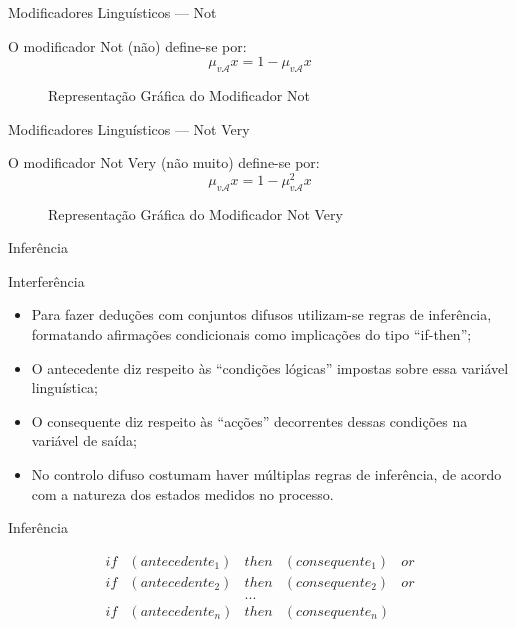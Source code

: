 \documentclass[portuges]{beamer}
\begin{document}
\begin{frame}{Modificadores Linguísticos --- Not}
	\begin{definition}[Not]
		O modificador \alert{Not} (não) define-se por:
		$$\mu_{v\mathcal{A}}{x} = 1 - \mu_{v\mathcal{A}}{x}$$ 
	\end{definition}
	\begin{figure}
			\centering
			\caption{Representação Gráfica do Modificador Not}
	\end{figure}	
\end{frame}

\begin{frame}{Modificadores Linguísticos --- Not Very}
	\begin{definition}
		O modificador \alert{Not Very} (não muito) define-se por:
		$$\mu_{v\mathcal{A}}{x} = 1 - \mu_{v\mathcal{A}}^2{x}$$ 
	\end{definition}
	\begin{figure}
			\centering
			\caption{Representação Gráfica do Modificador Not Very}
	\end{figure}	
\end{frame}

\begin{frame}{Inferência}
\begin{block}{Interferência}
\begin{itemize}[<+->]
\item
Para fazer deduções com conjuntos difusos utilizam-se \alert{regras de inferência},
		formatando afirmações condicionais como implicações do tipo ``if-then'';
\item O antecedente
		diz respeito às ``condições lógicas'' impostas sobre essa variável linguística;
\item O consequente
		diz respeito às ``acções'' decorrentes dessas condições na variável de saída;
\item No controlo difuso costumam haver múltiplas regras de inferência, de acordo com a natureza 
dos estados medidos no processo.
\end{itemize}
\end{block}
\end{frame}

\begin{frame}{Inferência}
\begin{example}
$$
	\begin{array}{ccccc}
	if & (antecedente_1) & then & (consequente_1) & or \\
	if & (antecedente_2) & then & (consequente_2) & or \\
	 &  & ... &  & \\
	if & (antecedente_n) & then & (consequente_n) &
	\end{array}
$$
\end{example}
\end{frame}
\end{document}
